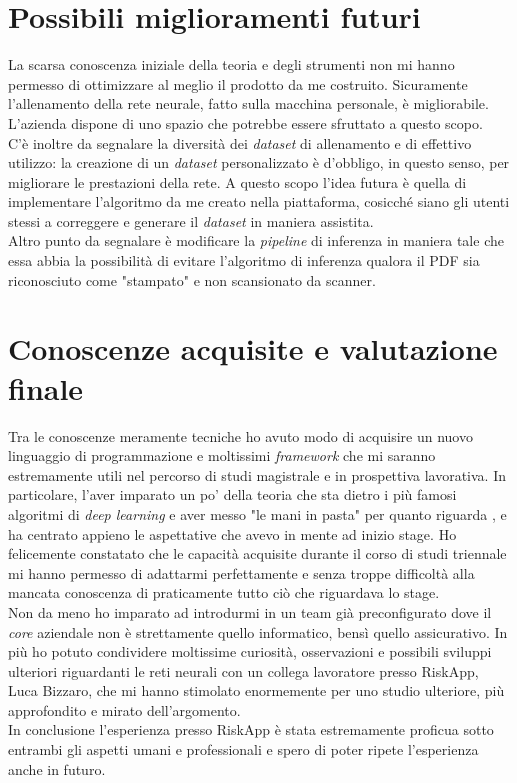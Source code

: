 \section{Possibili miglioramenti futuri}
La scarsa conoscenza iniziale della teoria e degli strumenti non mi hanno permesso di ottimizzare al meglio il prodotto da me costruito. Sicuramente l'allenamento della rete neurale, fatto sulla macchina personale, è migliorabile. L'azienda dispone di uno spazio  che potrebbe essere sfruttato a questo scopo.
\medskip
\\C'è inoltre da segnalare la diversità dei \textit{dataset} di allenamento e di effettivo utilizzo: la creazione di un \textit{dataset} personalizzato è d'obbligo, in questo senso, per migliorare le prestazioni della rete. A questo scopo l'idea futura è quella di implementare l'algoritmo da me creato nella piattaforma, cosicché siano gli utenti stessi a correggere e generare il \textit{dataset} in maniera assistita.
\medskip
\\Altro punto da segnalare è modificare la \textit{pipeline} di inferenza in maniera tale che essa abbia la possibilità di evitare l'algoritmo di inferenza qualora il PDF sia riconosciuto come "stampato" e non scansionato da scanner.

\section{Conoscenze acquisite e valutazione finale}
Tra le conoscenze meramente tecniche ho avuto modo di acquisire un nuovo linguaggio di programmazione e moltissimi \textit{framework} che mi saranno estremamente utili nel percorso di studi magistrale e in prospettiva lavorativa. In particolare, l'aver imparato un po' della teoria che sta dietro i più famosi algoritmi di \textit{deep learning} e aver messo "le mani in pasta" per quanto riguarda ,  e  ha centrato appieno le aspettative che avevo in mente ad inizio stage. Ho felicemente constatato che le capacità acquisite durante il corso di studi triennale mi hanno permesso di adattarmi perfettamente e senza troppe difficoltà alla mancata conoscenza di praticamente tutto ciò che riguardava lo stage.
\medskip
\\Non da meno ho imparato ad introdurmi in un team già preconfigurato dove il \textit{core} aziendale non è strettamente quello informatico, bensì quello assicurativo. In più ho potuto condividere moltissime curiosità, osservazioni e possibili sviluppi ulteriori riguardanti le reti neurali con un collega lavoratore presso RiskApp, Luca Bizzaro, che mi hanno stimolato enormemente per uno studio ulteriore, più approfondito e mirato dell'argomento.
\medskip
\\In conclusione l'esperienza presso RiskApp è stata estremamente proficua sotto entrambi gli aspetti umani e professionali e spero di poter ripete l'esperienza anche in futuro.



